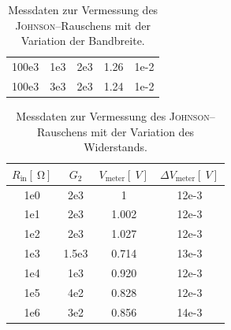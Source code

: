 \documentclass[sn-mathphys-num,iicol]{sn-jnl}
\theoremstyle{thmstyleone}
\theoremstyle{thmstyletwo}
\theoremstyle{thmstylethree}
\begin{document}
\begin{table}[h]
\begin{tabular}{S[table-format=3.1e1] S[table-format=3e1] S[table-format=1e1] S[table-format=1.2] S[table-format=2e1]}
		100e3                   & 1e3                     & 2e3     & 1.26                                  & 1e-2                                         \\
		100e3                   & 3e3                     & 2e3     & 1.24                                  & 1e-2                                         \\
		\bottomrule
	\end{tabular}
	\caption{Messdaten zur Vermessung des \textsc{Johnson}--Rauschens mit der Variation der Bandbreite.}
	\label{tab:john_freq}
\end{table}

\begin{table}[h]
	\begin{tabular}{S[table-format=1e1]S[table-format=1.1e1]S[table-format=1.3]S[table-format=2e1]}
		\toprule
		$R_\text{in}[\SI{}{\ohm}]$ & $G_{2}$ & $V_\text{meter}[\SI{}{V}]$ & $\Delta V_\text{meter}[\SI{}{V}]$ \\
		\midrule
		1e0                        & 2e3     & 1                          & 12e-3                             \\
		1e1                        & 2e3     & 1.002                      & 12e-3                             \\
		1e2                        & 2e3     & 1.027                      & 12e-3                             \\
		1e3                        & 1.5e3   & 0.714                      & 13e-3                             \\
		1e4                        & 1e3     & 0.920                      & 12e-3                             \\
		1e5                        & 4e2     & 0.828                      & 12e-3                             \\
		1e6                        & 3e2     & 0.856                      & 14e-3                             \\
		\bottomrule
	\end{tabular}
	\caption{Messdaten zur Vermessung des \textsc{Johnson}--Rauschens mit der Variation des Widerstands.}
	\label{tab:john_wid}
\end{table}
\end{document}

